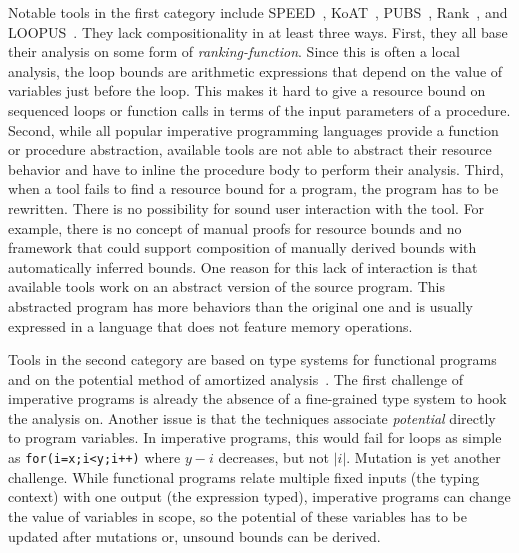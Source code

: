 \documentclass[nocopyrightspace,preprint]{sigplanconf}
\begin{document}
Notable tools in the first category include
SPEED~\cite{GulwaniMC09}, KoAT~\cite{BrockschmidtEFFG14},
PUBS~\cite{AlbertAGPZ12}, Rank~\cite{AliasDFG10},
and LOOPUS~\cite{SinnZV14}.
They lack compositionality in at least three ways.
First, they all base their analysis on some form of
\emph{ranking-function}.
Since this
is often a local analysis, the loop bounds are
arithmetic expressions that depend on the value of
variables  just before the loop.
This makes it hard to give a
resource bound on sequenced loops or function calls in
terms of the input parameters of a procedure.
Second, while all popular imperative programming languages
provide a function or procedure abstraction, available
tools are not able to abstract their resource behavior
and have to inline the procedure body to perform their
analysis.  Third, when a tool fails to find a resource
bound for a program, the program has to be rewritten.
There is no possibility for sound user interaction with the
tool. For example, there is no concept of manual proofs for
resource bounds and no framework that could support composition
of manually derived bounds with automatically inferred bounds.
One reason for this lack of interaction is that available tools
work on an abstract version of the source program. This
abstracted program has more behaviors than the
original one and is usually expressed in a language that
does not feature memory operations.
%

Tools in the second category are based on type systems for functional
programs and on the potential method of amortized
analysis~\cite{Jost03,HoffmannAH12}.  The first challenge of
imperative programs is already the absence of a fine-grained type system to hook
the analysis on.  Another issue is that the techniques associate
\emph{potential} directly to program variables.  In
imperative programs, this would fail for loops as simple as
\lstinline{for(i=x;i<y;i++)} where $y - i$ decreases, but not $|i|$.
Mutation is yet another challenge.  While functional programs relate
multiple fixed inputs (the typing context) with one output (the
expression typed), imperative programs can change the value of
variables in scope, so the potential of these variables has to be
updated after mutations or, unsound bounds can be derived.
%
\end{document}
